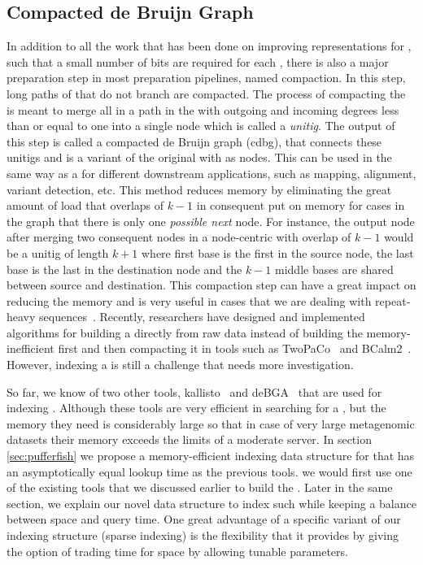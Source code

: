 \subsection{Compacted de Bruijn Graph}
\label{subsubsec:cdbg}
In addition to all the work that has been done on improving representations for \dbgs, such that a small number of bits are required for each \kmer, there is also a major preparation step in most \dbg preparation pipelines, named compaction. In this step, long paths of \kmers that do not branch are compacted. The process of compacting the \dbg is meant to merge all \kmers in a path in the \dbg with outgoing and incoming degrees less than or equal to one into a single node which is called a \emph{unitig}. The output of this step is called a compacted de Bruijn graph (cdbg), that connects these unitigs and is a variant of the original \dbg with \kmers as nodes. This can be used in the same way as a \dbg for different downstream applications, such as mapping, alignment, variant detection, etc. This method reduces memory by eliminating the great amount of load that overlaps of $k-1$ in consequent \kmers put on memory for cases in the graph that there is only one \textit{possible next} node. For instance, the output node after merging two consequent nodes in a node-centric \dbg with overlap of $k-1$ would be a unitig of length $k+1$ where first base is the first in the source node, the last base is the last in the destination node and the $k-1$ middle bases are shared between source and destination. This compaction step can have a great impact on reducing the memory and is very useful in cases that we are dealing with repeat-heavy sequences~\cite{liu2016debga}. Recently, researchers have designed and implemented algorithms for building a \ccdbg directly from raw data instead of building the memory-inefficient \dbg first and then compacting it in tools such as TwoPaCo~\cite{minkin2016twopaco} and BCalm2~\cite{chikhi2016compacting}. However, indexing a \ccdbg is still a challenge that needs more investigation. 

So far, we know of two other tools, kallisto~\cite{Bray2016Kallisto} and deBGA~\cite{liu2016debga} that are used for indexing \ccdbgs. Although these tools are very efficient in searching for a \kmer, but the memory they need is considerably large so that in case of very large metagenomic datasets their memory exceeds the limits of a moderate server. In section \ref{sec:pufferfish} we propose a memory-efficient indexing data structure for \ccdbgs that has an asymptotically equal \kmer lookup time as the previous tools. we would first use one of the existing tools that we discussed earlier to build the \ccdbg. Later in the same section, we explain our novel data structure to index such \ccdbgs while keeping a balance between space and query time. One great advantage of a specific variant of our indexing structure (sparse indexing) is the flexibility that it provides by giving the option of trading time for space by allowing tunable parameters.


